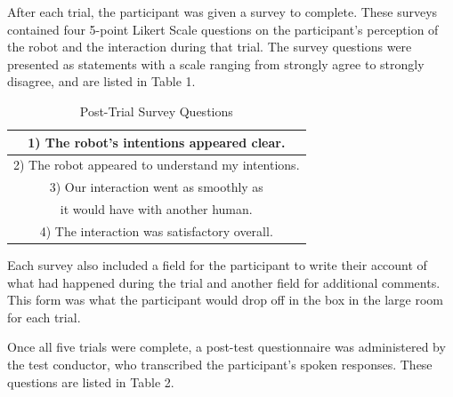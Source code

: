 \documentclass[letterpaper, 10 pt, conference]{ieeeconf}  %
\begin{document}
After each trial, the participant was given a survey to complete. These surveys contained four 5-point Likert Scale questions on the participant’s perception of the robot and the interaction during that trial. The survey questions were presented as statements with a scale ranging from strongly agree to strongly disagree, and are listed in Table 1.

\begin{table}[h]
\caption{Post-Trial Survey Questions}
\label{survey_questions}
\begin{center}
\begin{tabular}{|c|}
\hline
1) The robot’s intentions appeared clear.\\
\hline
2) The robot appeared to understand my intentions.\\
\hline
3) Our interaction went as smoothly as \\
it would have with another human.\\
\hline
4) The interaction was satisfactory overall.\\
\hline
\end{tabular}
\end{center}
\end{table}

Each survey also included a field for the participant to write their account of what had happened during the trial and another field for additional comments. This form was what the participant would drop off in the box in the large room for each trial.

Once all five trials were complete, a post-test questionnaire was administered by the test conductor, who transcribed the participant’s spoken responses. These questions are listed in Table 2.
\end{document}
